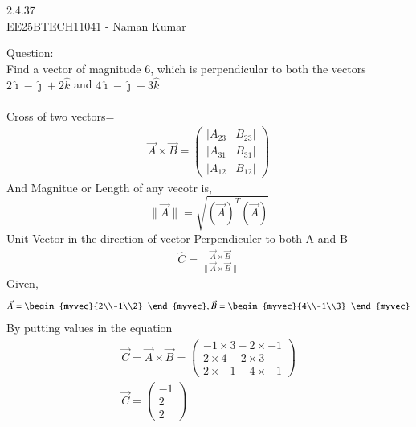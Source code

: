 \documentclass[journal]{IEEEtran}
\author{EE25BTECH11041-Naman Kumar }
\begin{document}
\begin{center}
    \huge{2.4.37}\\
    \large{EE25BTECH11041 - Naman Kumar}
\end{center}
Question:\\
Find a vector of magnitude 6, which is perpendicular to both the vectors $2\hat{\imath} - \hat{\jmath} + 2\hat{k}$ and $4\hat{\imath} - \hat{\jmath} + 3\hat{k}$\\
\solution \\
Cross of two vectors=\\
\begin{align}
\vec{A}\times\vec{B}=
\begin{pmatrix}
    |A_{23}&B_{23}|\\
    |A_{31}&B_{31}|\\
    |A_{12}&B_{12}|
\end{pmatrix}
\end{align}
And Magnitue or Length of any vecotr is,
\begin{equation}
\lVert \vec{A}\rVert=\sqrt{(\vec{A})^{T}(\vec{A})}
\end{equation}
Unit Vector in the direction of vector Perpendiculer to both A and B
\begin{align}
    \hat{C}=\frac{\vec{A}\times\vec{B}}{\lVert\vec{A}\times\vec{B}\rVert}
\end{align}
Given,
\begin{align}
    \vec{A}=\begin{myvec}{2\\-1\\2} \end{myvec},
    \vec{B}=\begin{myvec}{4\\-1\\3} \end{myvec}
\end{align}
By putting values in the equation
\begin{align}
    \vec{C}=\vec{A}\times\vec{B}=
    \begin{pmatrix}
        -1\times3-2\times-1\\
        2\times4 - 2\times3\\
        2\times-1-4\times-1
    \end{pmatrix}\\
    \vec{C}=\begin{pmatrix}
        -1\\
        2\\
        2
    \end{pmatrix}
\end{align}
\end{document}
